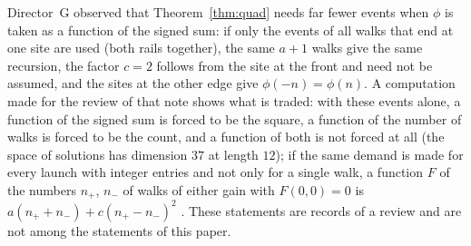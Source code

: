 Director~G observed \cite{dgg1} that Theorem~\ref{thm:quad} needs far fewer events when $\phi$ is taken as a function of the signed sum: if only the events of all walks that end at one site are used (both rails together), the same $a+1$ walks give the same recursion, the factor $c=2$ follows from the site at the front and need not be assumed, and the sites at the other edge give $\phi(-n)=\phi(n)$. A computation made for the review of that note shows what is traded: with these events alone, a function of the signed sum is forced to be the square, a function of the number of walks is forced to be the count, and a function of both is not forced at all (the space of solutions has dimension $37$ at length $12$); if the same demand is made for every launch with integer entries and not only for a single walk, a function $F$ of the numbers $n_+$, $n_-$ of walks of either gain with $F(0,0)=0$ is $a(n_++n_-)+c(n_+-n_-)^2$ \cite{comp4s}. These statements are records of a review and are not among the statements of this paper.

